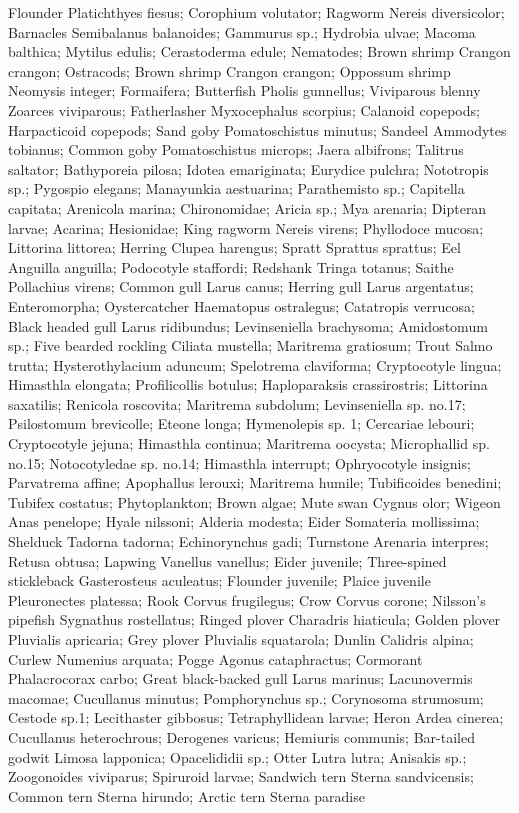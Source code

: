 Flounder Platichthyes fiesus; Corophium volutator; Ragworm Nereis diversicolor; Barnacles Semibalanus balanoides; Gammurus sp.; Hydrobia ulvae; Macoma balthica; Mytilus edulis; Cerastoderma edule; Nematodes; Brown shrimp Crangon crangon; Ostracods; Brown shrimp Crangon crangon; Oppossum shrimp Neomysis integer; Formaifera; Butterfish Pholis gunnellus; Viviparous blenny Zoarces viviparous; Fatherlasher Myxocephalus scorpius; Calanoid copepods; Harpacticoid copepods; Sand goby Pomatoschistus minutus; Sandeel Ammodytes tobianus; Common goby Pomatoschistus microps; Jaera albifrons; Talitrus saltator; Bathyporeia pilosa; Idotea emariginata; Eurydice pulchra; Nototropis sp.; Pygospio elegans; Manayunkia aestuarina; Parathemisto sp.; Capitella capitata; Arenicola marina; Chironomidae; Aricia sp.; Mya arenaria; Dipteran larvae; Acarina; Hesionidae; King ragworm Nereis virens; Phyllodoce mucosa; Littorina littorea; Herring Clupea harengus; Spratt Sprattus sprattus; Eel Anguilla anguilla; Podocotyle staffordi; Redshank Tringa totanus; Saithe Pollachius virens; Common gull Larus canus; Herring gull Larus argentatus; Enteromorpha; Oystercatcher Haematopus ostralegus; Catatropis verrucosa; Black headed gull Larus ridibundus; Levinseniella brachysoma; Amidostomum sp.; Five bearded rockling Ciliata mustella; Maritrema gratiosum; Trout Salmo trutta; Hysterothylacium aduncum; Spelotrema claviforma; Cryptocotyle lingua; Himasthla elongata; Profilicollis botulus; Haploparaksis crassirostris; Littorina saxatilis; Renicola roscovita; Maritrema subdolum; Levinseniella sp. no.17; Psilostomum brevicolle; Eteone longa; Hymenolepis sp. 1; Cercariae lebouri; Cryptocotyle jejuna; Himasthla continua; Maritrema oocysta; Microphallid sp. no.15; Notocotyledae sp. no.14; Himasthla interrupt; Ophryocotyle insignis; Parvatrema affine; Apophallus lerouxi; Maritrema humile; Tubificoides benedini; Tubifex costatus; Phytoplankton; Brown algae; Mute swan Cygnus olor; Wigeon Anas penelope; Hyale nilssoni; Alderia modesta; Eider Somateria mollissima; Shelduck Tadorna tadorna; Echinorynchus gadi; Turnstone Arenaria interpres; Retusa obtusa; Lapwing Vanellus vanellus; Eider juvenile; Three-spined stickleback Gasterosteus aculeatus; Flounder juvenile; Plaice juvenile Pleuronectes platessa; Rook Corvus frugilegus; Crow Corvus corone; Nilsson's pipefish Sygnathus rostellatus; Ringed plover Charadris hiaticula; Golden plover Pluvialis apricaria; Grey plover Pluvialis squatarola; Dunlin Calidris alpina; Curlew Numenius arquata; Pogge Agonus cataphractus; Cormorant Phalacrocorax carbo; Great black-backed gull Larus marinus; Lacunovermis macomae; Cucullanus minutus; Pomphorynchus sp.; Corynosoma strumosum; Cestode sp.1; Lecithaster gibbosus; Tetraphyllidean larvae; Heron Ardea cinerea; Cucullanus heterochrous; Derogenes varicus; Hemiuris communis; Bar-tailed godwit Limosa lapponica; Opacelididii sp.; Otter Lutra lutra; Anisakis sp.; Zoogonoides viviparus; Spiruroid larvae; Sandwich tern Sterna sandvicensis; Common tern Sterna hirundo; Arctic tern Sterna paradise\\
